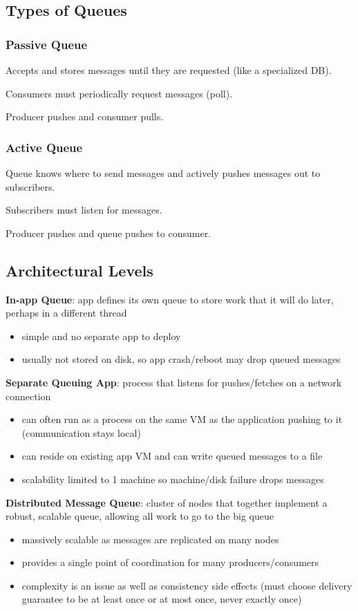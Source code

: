 \documentclass[11pt]{article}
\begin{document}
\subsection{Types of Queues}
\label{sec:org12f82be}
\subsubsection{Passive Queue}
\label{sec:orga09627b}
Accepts and stores messages until they are requested (like a specialized
DB).

Consumers must periodically request messages (poll).

Producer pushes and consumer pulls.
\subsubsection{Active Queue}
\label{sec:orgb8bb188}
Queue knows where to send messages and actively pushes messages out
to subscribers.

Subscribers must listen for messages.

Producer pushes and queue pushes to consumer.
\subsection{Architectural Levels}
\label{sec:org8cd56f4}
\textbf{In-app Queue}: app defines its own queue to store work that it will
do later, perhaps in a different thread
\begin{itemize}
\item simple and no separate app to deploy
\item usually not stored on disk, so app crash/reboot may drop queued
messages
\end{itemize}

\textbf{Separate Queuing App}: process that listens for pushes/fetches on a
network connection
\begin{itemize}
\item can often run as a process on the same VM as the application pushing
to it (communication stays local)
\item can reside on existing app VM and can write queued messages to a file
\item scalability limited to 1 machine so machine/disk failure drops
messages
\end{itemize}

\textbf{Distributed Message Queue}: cluster of nodes that together implement a
robust, scalable queue, allowing all work to go to the big queue
\begin{itemize}
\item massively scalable as messages are replicated on many nodes
\item provides a single point of coordination for many producers/consumers
\item complexity is an issue as well as consistency side effects (must choose
delivery guarantee to be at least once or at most once, never exactly
once)
\end{itemize}
\end{document}
